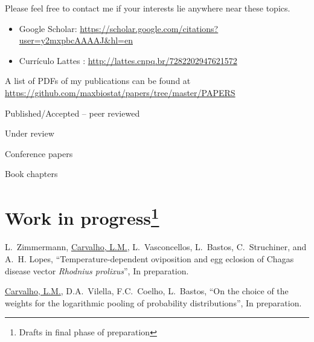 \documentclass[10pt]{article}
\begin{document}
Please feel free to contact me if your interests lie anywhere near these topics.

\begin{itemize}
 \item[] Google Scholar: \url{https://scholar.google.com/citations?user=y2mxpbcAAAAJ&hl=en}\\
 \item[] Curr\'iculo Lattes : \url{ http://lattes.cnpq.br/7282202947621572} 
\end{itemize}

\newpage
A list of PDFs of my publications can be found at \url{https://github.com/maxbiostat/papers/tree/master/PAPERS}
\nocite{*}
\begin{category}{Published/Accepted -- peer reviewed}
\end{category}

\begin{category}{Under review}
\end{category}

\begin{category}{Conference papers}
\end{category}

\begin{category}{Book chapters}
\end{category}




\section*{Work in progress\footnote{Drafts in final phase of preparation}}

L.~Zimmermann, \underline{Carvalho, L.M.}, L.~Vasconcellos, L.~Bastos, C.~Struchiner, and A.~H. Lopes, ``{T}emperature-dependent oviposition and egg eclosion of {C}hagas disease vector \textit{{R}hodnius prolixus}'', In preparation.

\underline{Carvalho, L.M.}, D.A.~Vilella, F.C.~Coelho, L.~Bastos, ``{O}n the choice of the weights for the logarithmic pooling of probability distributions'', In preparation.
\end{document}
